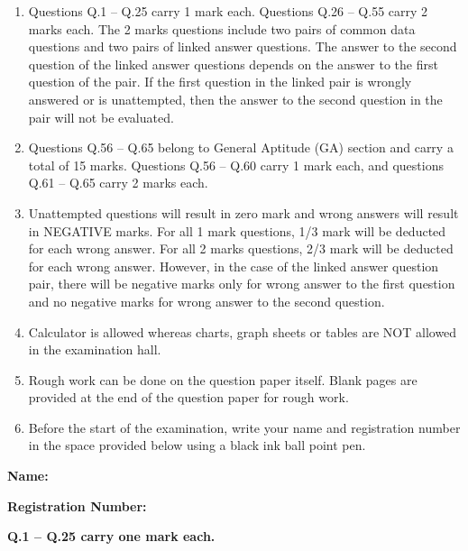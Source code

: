 \documentclass[journal,11pt,onecolumn]{IEEEtran}
\begin{document}
\begin{enumerate}
    \item Questions Q.1 -- Q.25 carry 1 mark each. Questions Q.26 -- Q.55 carry 2 marks each. The 2 marks questions include two pairs of common data questions and two pairs of linked answer questions. The answer to the second question of the linked answer questions depends on the answer to the first question of the pair. If the first question in the linked pair is wrongly answered or is unattempted, then the answer to the second question in the pair will not be evaluated.

    \item Questions Q.56 -- Q.65 belong to General Aptitude (GA) section and carry a total of 15 marks. Questions Q.56 -- Q.60 carry 1 mark each, and questions Q.61 -- Q.65 carry 2 marks each.

    \item Unattempted questions will result in zero mark and wrong answers will result in NEGATIVE marks. For all 1 mark questions, 1/3 mark will be deducted for each wrong answer. For all 2 marks questions, 2/3 mark will be deducted for each wrong answer. However, in the case of the linked answer question pair, there will be negative marks only for wrong answer to the first question and no negative marks for wrong answer to the second question.

    \item Calculator is allowed whereas charts, graph sheets or tables are NOT allowed in the examination hall.

    \item Rough work can be done on the question paper itself. Blank pages are provided at the end of the question paper for rough work.

    \item Before the start of the examination, write your name and registration number in the space provided below using a black ink ball point pen.
\end{enumerate}

\textbf{Name:} \underline{\hspace{6cm}}

\textbf{Registration Number:} \underline{\hspace{4cm}}

\newpage

\large\textbf{Q.1 -- Q.25 carry one mark each.}\\
\end{document}
